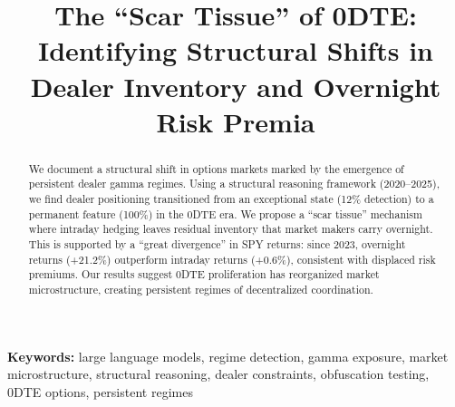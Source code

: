 \documentclass[12pt]{article}
\begin{document}
\title{The ``Scar Tissue'' of 0DTE: Identifying Structural Shifts in Dealer Inventory and Overnight Risk Premia}

\maketitle

\begin{abstract}
We document a structural shift in options markets marked by the emergence of persistent dealer gamma regimes. Using a structural reasoning framework (2020--2025), we find dealer positioning transitioned from an exceptional state (12\% detection) to a permanent feature (100\%) in the 0DTE era. We propose a ``scar tissue'' mechanism where intraday hedging leaves residual inventory that market makers carry overnight. This is supported by a ``great divergence'' in SPY returns: since 2023, overnight returns (+21.2\%) outperform intraday returns (+0.6\%), consistent with displaced risk premiums. Our results suggest 0DTE proliferation has reorganized market microstructure, creating persistent regimes of decentralized coordination.
\end{abstract}

\textbf{Keywords:} large language models, regime detection, gamma exposure, market microstructure, structural reasoning, dealer constraints, obfuscation testing, 0DTE options, persistent regimes






\FloatBarrier




\FloatBarrier


\FloatBarrier




\FloatBarrier


\end{document}
